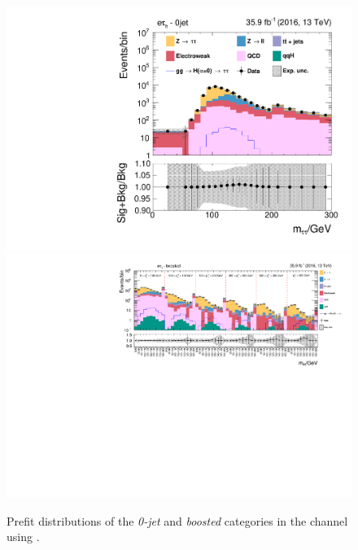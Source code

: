 \begin{figure}[h!]
    \centering
        \includegraphics[width=.5\textwidth]{Figures/statana/Postfit_JEC_jdphi/prefit_htt_et_1_13TeV.pdf}\\
        \includegraphics[width=\textwidth]{Figures/statana/Postfit_JEC_jdphi/prefit_htt_et_2_13TeV.pdf}
    \caption{Prefit distributions of the \textit{0-jet} and \textit{boosted} categories in the \etau{} channel  using \jdphi{}.}
\end{figure}  
